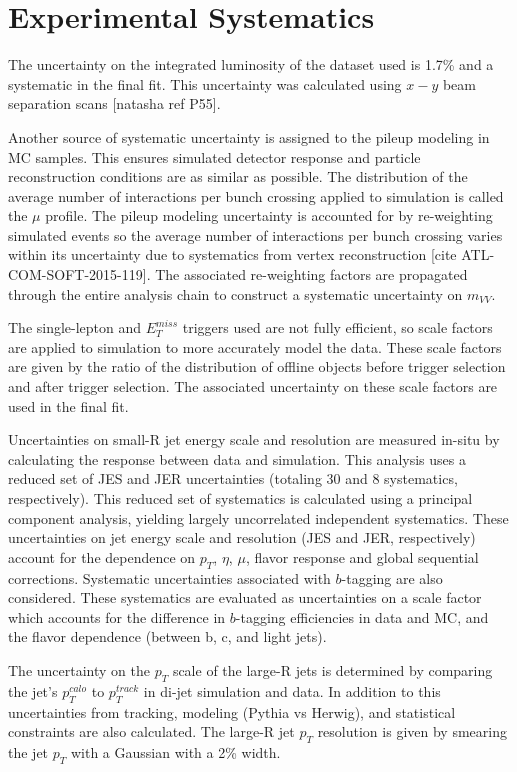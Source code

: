 \section{Experimental Systematics}
The uncertainty on the integrated luminosity of the dataset used is 1.7\% and a systematic in the final fit. This uncertainty was calculated using $x-y$ beam separation scans [natasha ref P55]. 

Another source of systematic uncertainty is assigned to the pileup modeling in MC samples. This ensures simulated detector response and particle reconstruction conditions are as similar as possible. The distribution of the average number of interactions per bunch crossing applied to simulation is called the $\mu$ profile. The pileup modeling uncertainty is accounted for by re-weighting simulated events so the average number of interactions per bunch crossing varies within its uncertainty due to systematics from vertex reconstruction [cite ATL-COM-SOFT-2015-119]. The associated re-weighting factors are propagated through the entire analysis chain to construct a systematic uncertainty on $m_{VV}$.

The single-lepton and $E_{T}^{miss}$ triggers used are not fully efficient, so scale factors are applied to simulation to more accurately model the data. These scale factors are given by the ratio of the distribution of offline objects before trigger selection and after trigger selection. The associated uncertainty on these scale factors are used in the final fit.

Uncertainties on small-R jet energy scale and resolution are measured in-situ by calculating the response between data and simulation. This analysis uses a reduced set of JES and JER uncertainties (totaling 30 and 8 systematics, respectively). This reduced set of systematics is calculated using a principal component analysis, yielding largely uncorrelated independent systematics. These uncertainties on jet energy scale and resolution (JES and JER, respectively) account for the dependence on $p_{T}$, $\eta$, $\mu$, flavor response and global sequential corrections. Systematic uncertainties associated with $b$-tagging are also considered. These systematics are evaluated as uncertainties on a scale factor which accounts for the difference in $b$-tagging efficiencies in data and MC, and the flavor dependence (between b, c, and light jets). 

The uncertainty on the $p_{T}$ scale of the large-R jets is determined by comparing the jet's $p_{T}^{calo}$ to $p_{T}^{track}$ in di-jet simulation and data. In addition to this uncertainties from tracking, modeling (Pythia vs Herwig), and statistical constraints are also calculated. The large-R jet $p_{T}$ resolution is given by smearing the jet $p_{T}$ with a Gaussian with a 2\% width.

